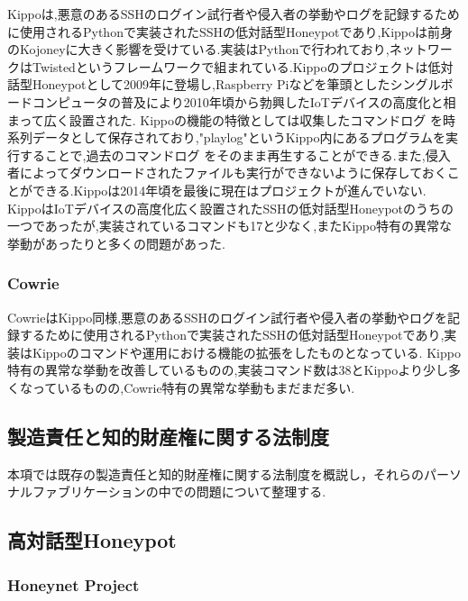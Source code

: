 Kippoは,悪意のあるSSHのログイン試行者や侵入者の挙動やログを記録するために使用されるPythonで実装されたSSHの低対話型Honeypotであり\cite{kippo},Kippoは前身のKojoney\cite{kojoney}に大きく影響を受けている.実装はPythonで行われており,ネットワークはTwisted\cite{twisted}というフレームワークで組まれている.Kippoのプロジェクトは低対話型Honeypotとして2009年に登場し,Raspberry Pi\cite{rasp}などを筆頭としたシングルボードコンピュータ\cite{singleboard}の普及により2010年頃から勃興したIoTデバイスの高度化\cite{iot}と相まって広く設置された.
Kippoの機能の特徴としては収集したコマンドログ を時系列データとして保存されており,"playlog"というKippo内にあるプログラムを実行することで,過去のコマンドログ をそのまま再生することができる.また,侵入者によってダウンロードされたファイルも実行ができないように保存しておくことができる.Kippoは2014年頃を最後に現在はプロジェクトが進んでいない.\cite{kippowiki}
KippoはIoTデバイスの高度化広く設置されたSSHの低対話型Honeypotのうちの一つであったが,実装されているコマンドも17\cite{kippocommand}と少なく,またKippo特有の異常な挙動があったりと多くの問題があった.

\subsubsection{Cowrie}
\label{tech:Cowrie}
CowrieはKippo同様,悪意のあるSSHのログイン試行者や侵入者の挙動やログを記録するために使用されるPythonで実装されたSSHの低対話型Honeypotであり,実装はKippoのコマンドや運用における機能の拡張をしたものとなっている.
Kippo特有の異常な挙動を改善しているものの,実装コマンド数は38\cite{cowriecommand}とKippoより少し多くなっているものの\cite{differfromkippo},Cowrie特有の異常な挙動もまだまだ多い.

\subsection{製造責任と知的財産権に関する法制度}
\label{tech:lows}

本項では既存の製造責任と知的財産権に関する法制度を概説し，それらのパーソナルファブリケーションの中での問題について整理する.

\subsection{高対話型Honeypot}
\label{tech:HighInteractionHoneypot}

\subsubsection{Honeynet Project}
\label{tech:Honeynet}

